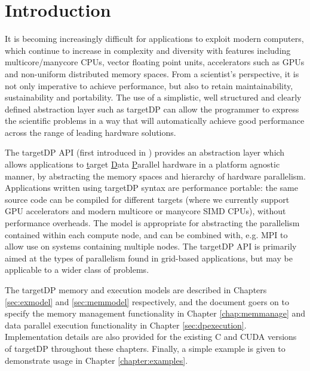 
\chapter{Introduction}



It is becoming increasingly difficult for applications to exploit
modern computers, which continue to increase in complexity and
diversity with features including multicore/manycore CPUs, vector
floating point units, accelerators such as GPUs and non-uniform
distributed memory spaces.  From a scientist's perspective, it is not
only imperative to achieve performance, but also to retain
maintainability, sustainability and portability. The use of a
simplistic, well structured and clearly defined abstraction layer such
as targetDP can allow the programmer to express the scientific
problems in a way that will automatically achieve good performance
across the range of leading hardware solutions.

The targetDP API (first introduced in \cite{hpcc}) provides an
abstraction layer which allows applications to \underline{t}arget
\underline{D}ata \underline{P}arallel hardware in a platform agnostic
manner, by abstracting the memory spaces and hierarchy of hardware
parallelism. Applications written using targetDP syntax are
performance portable: the same source code can be compiled for
different targets (where we currently support GPU accelerators and
modern multicore or manycore SIMD CPUs), without performance
overheads. The model is appropriate for abstracting the parallelism
contained within each compute node, and can be combined with, e.g. MPI
to allow use on systems containing multiple nodes. The targetDP API is
primarily aimed at the types of parallelism found in grid-based
applications, but may be applicable to a wider class of problems.

The targetDP memory and execution models are described in Chapters \ref{sec:exmodel} and \ref{sec:memmodel} respectively, and the document goers on to specify the memory management functionality in Chapter \ref{chap:memmanage} and data parallel execution functionality in Chapter  \ref{sec:dpexecution}. Implementation details are also provided for the existing C and CUDA versions of targetDP throughout these chapters. Finally, a simple
example is given to demonstrate usage in Chapter \ref{chapter:examples}.



